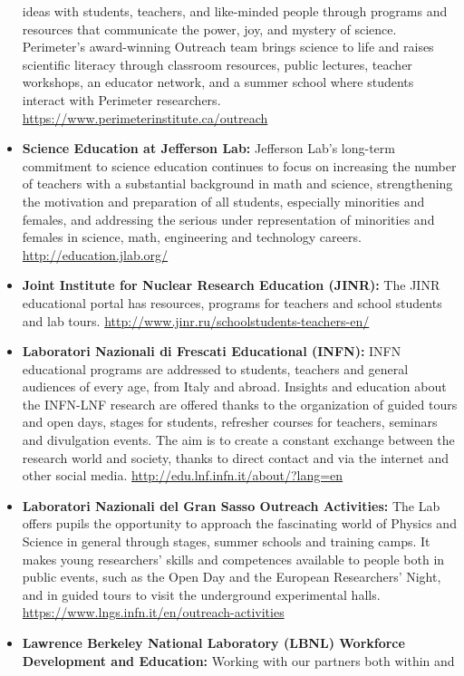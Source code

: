 \begin{itemize}
  ideas with students, teachers, and like-minded people through programs
  and resources that communicate the power, joy, and mystery of science.
  Perimeter's award-winning Outreach team brings science to life and
  raises scientific literacy through classroom resources, public
  lectures, teacher workshops, an educator network, and a summer school
  where students interact with Perimeter researchers.
  \url{https://www.perimeterinstitute.ca/outreach}
\item
  \textbf{Science Education at Jefferson Lab:} Jefferson Lab's long-term
  commitment to science education continues to focus on increasing the
  number of teachers with a substantial background in math and science,
  strengthening the motivation and preparation of all students,
  especially minorities and females, and addressing the serious under
  representation of minorities and females in science, math, engineering
  and technology careers. \url{http://education.jlab.org/}
\item
  \textbf{Joint Institute for Nuclear Research Education (JINR):} The
  JINR educational portal has resources, programs for teachers and
  school students and lab tours.
  \url{http://www.jinr.ru/schoolstudents-teachers-en/}
\item
  \textbf{Laboratori Nazionali di Frescati Educational (INFN):} INFN
  educational programs are addressed to students, teachers and general
  audiences of every age, from Italy and abroad. Insights and education
  about the INFN-LNF research are offered thanks to the organization of
  guided tours and open days, stages for students, refresher courses for
  teachers, seminars and divulgation events. The aim is to create a
  constant exchange between the research world and society, thanks to
  direct contact and via the internet and other social media.
  \url{http://edu.lnf.infn.it/about/?lang=en}
\item
  \textbf{Laboratori Nazionali del Gran Sasso Outreach Activities:} The
  Lab offers pupils the opportunity to approach the fascinating world of
  Physics and Science in general through stages, summer schools and
  training camps. It makes young researchers' skills and competences
  available to people both in public events, such as the Open Day and
  the European Researchers' Night, and in guided tours to visit the
  underground experimental halls.
  \url{https://www.lngs.infn.it/en/outreach-activities}
\item
  \textbf{Lawrence Berkeley National Laboratory (LBNL) Workforce
  Development and Education:} Working with our partners both within and

\end{itemize}
